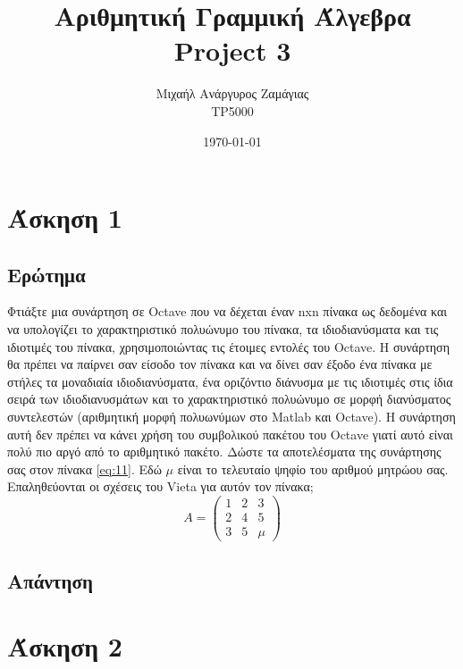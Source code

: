 \documentclass[12pt, fleqn, leqno]{extreport}
\begin{document}
\title{Αριθμητική Γραμμική Άλγεβρα\\Project 3}
\author{Μιχαήλ Ανάργυρος Ζαμάγιας\\TP5000}
\date{\today}
\maketitle
\newpage

\tableofcontents

\chapter{Άσκηση 1}

\section{Ερώτημα}
Φτιάξτε μια συνάρτηση σε Octave που να δέχεται έναν nxn πίνακα ως δεδομένα και να υπολογίζει το χαρακτηριστικό πολυώνυμο του πίνακα, τα ιδιοδιανύσματα και τις ιδιοτιμές του πίνακα, χρησιμοποιώντας τις έτοιμες εντολές του Octave. Η συνάρτηση θα πρέπει να παίρνει σαν είσοδο τον πίνακα και να δίνει σαν έξοδο ένα πίνακα με στήλες τα μοναδιαία ιδιοδιανύσματα, ένα οριζόντιο διάνυσμα με τις ιδιοτιμές στις ίδια σειρά των ιδιοδιανυσμάτων και το χαρακτηριστικό πολυώνυμο σε μορφή διανύσματος συντελεστών (αριθμητική μορφή πολυωνύμων στο Matlab και Octave). Η συνάρτηση αυτή δεν πρέπει να κάνει χρήση του συμβολικού πακέτου του Octave γιατί αυτό είναι πολύ πιο αργό από το αριθμητικό πακέτο. Δώστε τα αποτελέσματα της συνάρτησης σας στον πίνακα \eqref{eq:11}. Εδώ $\mu$ είναι το τελευταίο ψηφίο του αριθμού μητρώου σας. Επαληθεύονται οι σχέσεις του Vieta για αυτόν τον πίνακα;
\begin{equation}%
    A = \begin{pmatrix}
        1 & 2 & 3   \\
        2 & 4 & 5   \\
        3 & 5 & \mu
    \end{pmatrix}\label{eq:11}
\end{equation}

\newpage
\section{Απάντηση}



\chapter{Άσκηση 2}
\end{document}
